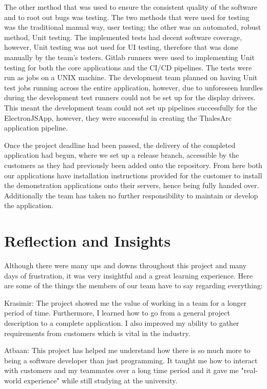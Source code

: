 \documentclass{l3proj}
\begin{document}
The other method that was used to ensure the consistent quality of the software and to root out bugs was testing. The two methods that were used for testing was the traditional manual way, user testing; the other was an automated, robust method, Unit testing. The implemented tests had decent software coverage, however, Unit testing was not used for UI testing, therefore that was done manually by the team's testers. Gitlab runners were used to implementing Unit testing for both the core applications and the CI/CD pipelines. The tests were run as jobs on a UNIX machine. The development team planned on having Unit test jobs running across the entire application, however, due to unforeseen hurdles during the development test runners could not be set up for the display drivers. This meant the development team could not set up pipelines successfully for the ElectronJSApp, however, they were successful in creating the ThalesArc application pipeline. 

Once the project deadline had been passed, the delivery of the completed application had begun, where we set up a release branch, accessible by the customers as they had previously been added onto the repository. From here both our applications have installation instructions provided for the customer to install the demonstration applications onto their servers, hence being fully handed over. Additionally the team has taken no further responsibility to maintain or develop the application. 
\section{Reflection and Insights}

Although there were many ups and downs throughout this project and many days of frustration, it was very insightful and a great learning experience. Here are some of the things the members of our team have to say regarding everything:

Krasimir: The project showed me the value of working in a team for a longer period of time. Furthermore, I learned how to go from a general project description to a complete application. I also improved my ability to gather requirements from customers which is vital in the industry.

Atbaan: This project has helped me understand how there is so much more to being a software developer than just programming. It taught me how to interact with customers and my teammates over a long time period and it gave me "real-world experience" while still studying at the university.
\end{document}

